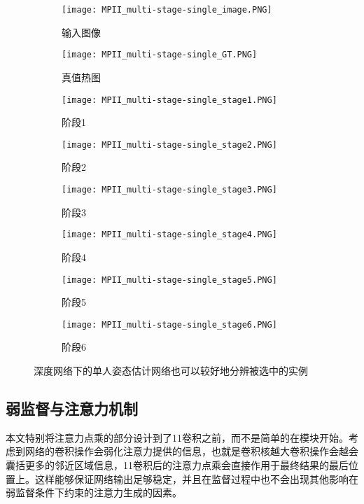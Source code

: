 \begin{figure}[h]
\centering
\begin{subfigure}[b]{0.2\linewidth}
	\texttt{[image: MPII\_multi-stage-single\_image.PNG]}
	\caption{输入图像}
\end{subfigure}
\begin{subfigure}[b]{0.2\linewidth}
	\texttt{[image: MPII\_multi-stage-single\_GT.PNG]}
	\caption{真值热图}
\end{subfigure}
\begin{subfigure}[b]{0.2\linewidth}
	\texttt{[image: MPII\_multi-stage-single\_stage1.PNG]}
	\caption{阶段1}
\end{subfigure}
\begin{subfigure}[b]{0.2\linewidth}
	\texttt{[image: MPII\_multi-stage-single\_stage2.PNG]}
	\caption{阶段2}
\end{subfigure}

\begin{subfigure}[b]{0.2\linewidth}
	\texttt{[image: MPII\_multi-stage-single\_stage3.PNG]}
	\caption{阶段3}
\end{subfigure}
\begin{subfigure}[b]{0.2\linewidth}
	\texttt{[image: MPII\_multi-stage-single\_stage4.PNG]}
	\caption{阶段4}
\end{subfigure}
\begin{subfigure}[b]{0.2\linewidth}
	\texttt{[image: MPII\_multi-stage-single\_stage5.PNG]}
	\caption{阶段5}
\end{subfigure}
\begin{subfigure}[b]{0.2\linewidth}
	\texttt{[image: MPII\_multi-stage-single\_stage6.PNG]}
	\caption{阶段6}
\end{subfigure}
\caption{深度网络下的单人姿态估计网络也可以较好地分辨被选中的实例}
\label{fig:singleposemultistage}
\end{figure}

\subsection{弱监督与注意力机制}
\label{subsec:weaksuper_attention}

本文特别将注意力点乘的部分设计到了1\times1卷积之前，而不是简单的在模块开始。考虑到网络的卷积操作会弱化注意力提供的信息，也就是卷积核越大卷积操作会越会囊括更多的邻近区域信息，1\times1卷积后的注意力点乘会直接作用于最终结果的最后位置上。这样能够保证网络输出足够稳定，并且在监督过程中也不会出现其他影响在弱监督条件下约束的注意力生成的因素。

